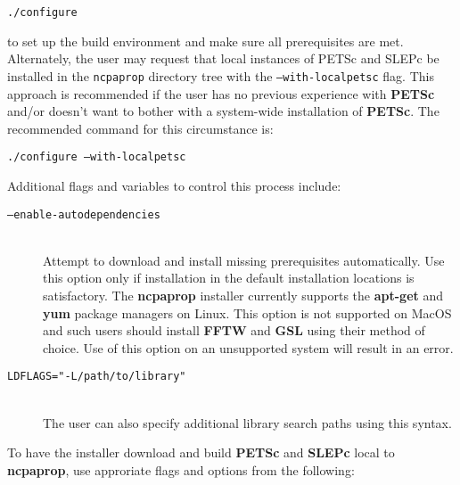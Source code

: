 \texttt{./configure}

\noindent
to set up the build environment and make sure all prerequisites are met.  Alternately, the user may request that local instances of PETSc and SLEPc be installed in the \texttt{ncpaprop} directory tree with the \texttt{--with-localpetsc} flag.  This approach is recommended if the user has no previous experience with \textbf{PETSc} and/or doesn't want to bother with a system-wide installation of \textbf{PETSc}.  The recommended command for this circumstance is:

\texttt{./configure --with-localpetsc}

\noindent
Additional flags and variables to control this process include:

\begin{description}
\item[\texttt{--enable-autodependencies}]\hfill \\
\noindent
Attempt to download and install missing prerequisites automatically. Use this option only if installation in the default installation locations is satisfactory. The \textbf{ncpaprop} installer currently supports the \textbf{apt-get} and \textbf{yum} package managers on Linux.  This option is not supported on MacOS and such users should install \textbf{FFTW} and \textbf{GSL} using their method of choice.  Use of this option on an unsupported system will result in an error.

\item[\texttt{LDFLAGS="-L/path/to/library"}]\hfill \\
\noindent
The user can also specify additional library search paths using this syntax.
\end{description}

\noindent To have the installer download and build \textbf{PETSc} and \textbf{SLEPc} local to \textbf{ncpaprop}, use approriate flags and options from the following:

